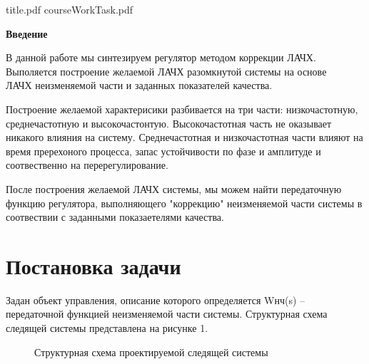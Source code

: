 \documentclass[russian, utf8]{eskdtext}
\newcommand*{\StructSection}[1]{\centerline{\Large \bfseries #1}\vspace{21pt}}
\begin{document}
 {title.pdf}
\newpage
 {courseWorkTask.pdf}
\newpage

\tableofcontents
\thispagestyle{empty}
\newpage

% 

\StructSection{Введение}
В данной работе мы синтезируем регулятор методом коррекции ЛАЧХ. Выполяется построение желаемой ЛАЧХ разомкнутой системы на основе \\ ЛАЧХ неизменяемой части и заданных показателей качества. \par
Построение желаемой характерисики разбивается на три части: низкочастотную, среднечастотную и высокочастонтую. Высокочастотная часть не оказывает никакого влияния на систему. Среднечастотная и низкочастотная части влияют на время пререхоного процесса, запас устойчивости по фазе и амплитуде и соотвественно на перерегулирование. \par
После построения желаемой ЛАЧХ системы, мы можем найти передаточную функцию регулятора, выполняющего "коррекцию" неизменяемой части системы в соотвествии с заданными показаетелями качества.

\newpage

\section{Постановка задачи}

Задан объект управления, описание которого определяется Wнч(s) – передаточной функцией неизменяемой части системы. Структурная схема следящей системы представлена на рисунке 1.

\begin{figure}[h!]
\centering
{}
\caption{Структурная схема проектируемой следящей системы}
\end{figure}
\end{document}

